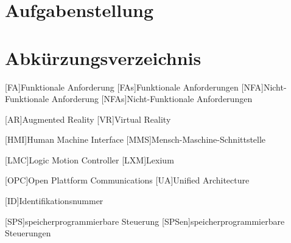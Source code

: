 \documentclass[12pt, a4paper, twoside]{article} %
\begin{document}
\section*{Aufgabenstellung}
\clearpage

\listoffigures
\clearpage

\listoftables
\clearpage

\section*{Abkürzungsverzeichnis}
\begin{acronym}[FA]
	[FA]{Funktionale Anforderung}
	[FAs]{Funktionale Anforderungen}
	[NFA]{Nicht-Funktionale Anforderung}
	[NFAs]{Nicht-Funktionale Anforderungen}
\end{acronym}
\begin{acronym}[VR]
	[AR]{Augmented Reality}
	[VR]{Virtual Reality}
\end{acronym}
\begin{acronym}[HMI]
	[HMI]{Human Machine Interface}
	[MMS]{Mensch-Maschine-Schnittstelle}
\end{acronym}
\begin{acronym}[LMC]
	[LMC]{Logic Motion Controller}
	[LXM]{Lexium}
\end{acronym}
\begin{acronym}[OPC]
	[OPC]{Open Plattform Communications}
	[UA]{Unified Architecture}
\end{acronym}
\begin{acronym}[ID]
	[ID]{Identifikationsnummer}
\end{acronym}
\begin{acronym}[SPS]
	[SPS]{speicherprogrammierbare Steuerung}
	[SPSen]{speicherprogrammierbare Steuerungen}
\end{acronym}
\clearpage

\pagestyle{fancy}



\newpage

\end{document}
